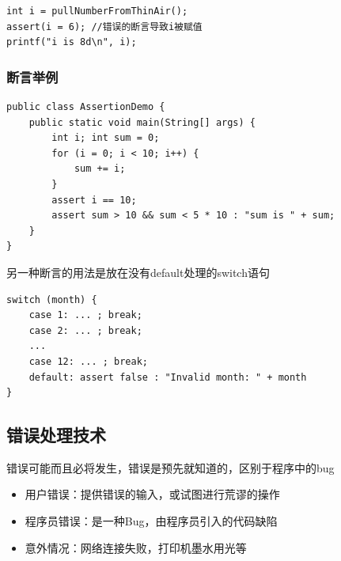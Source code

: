\begin{lstlisting}
int i = pullNumberFromThinAir();
assert(i = 6); //错误的断言导致i被赋值
printf("i is 8d\n", i);
\end{lstlisting}

\subsubsection{断言举例}
\begin{lstlisting}
public class AssertionDemo {
    public static void main(String[] args) {
        int i; int sum = 0;
        for (i = 0; i < 10; i++) {
            sum += i;
        }
        assert i == 10;
        assert sum > 10 && sum < 5 * 10 : "sum is " + sum;
    }
}
\end{lstlisting}

另一种断言的用法是放在没有default处理的switch语句
\begin{lstlisting}
switch (month) {
    case 1: ... ; break;
    case 2: ... ; break;
    ...
    case 12: ... ; break;
    default: assert false : "Invalid month: " + month
}
\end{lstlisting}


\subsection{错误处理技术}
错误可能而且必将发生，错误是预先就知道的，区别于程序中的bug
\begin{itemize}
    \item 用户错误：提供错误的输入，或试图进行荒谬的操作
    \item 程序员错误：是一种Bug，由程序员引入的代码缺陷
    \item 意外情况：网络连接失败，打印机墨水用光等
\end{itemize}

